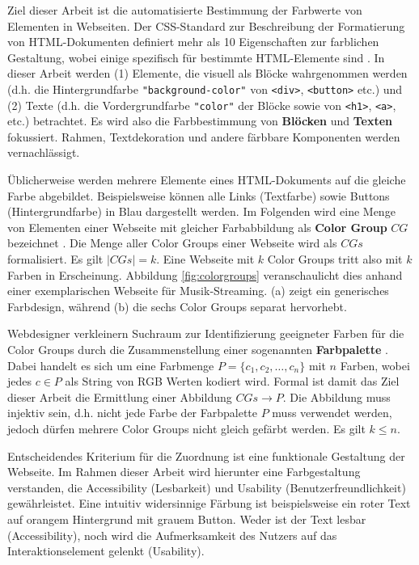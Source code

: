 \documentclass[11pt,a4paper,bibliography=totoc,twocolumn]{scrartcl}
\begin{document}
Ziel dieser Arbeit ist die automatisierte Bestimmung der Farbwerte von Elementen in Webseiten. Der CSS-Standard zur Beschreibung der Formatierung von HTML-Dokumenten definiert mehr als 10 Eigenschaften zur farblichen Gestaltung, wobei einige spezifisch für bestimmte  HTML-Elemente sind  \citep{css3-color}. In dieser Arbeit werden (1) Elemente, die visuell als Blöcke wahrgenommen werden (d.h. die Hintergrundfarbe \texttt{"background-color"} von \texttt{<div>}, \texttt{<button>} etc.) und (2) Texte (d.h. die Vordergrundfarbe \texttt{"color"} der Blöcke sowie von \texttt{<h1>}, \texttt{<a>}, etc.) betrachtet. Es wird also die Farbbestimmung von \textbf{Blöcken} und \textbf{Texten} fokussiert. Rahmen, Textdekoration und andere färbbare Komponenten werden vernachlässigt.

Üblicherweise werden mehrere Elemente eines HTML-Dokuments auf die gleiche Farbe abgebildet. Beispielsweise können alle Links (Textfarbe) sowie Buttons (Hintergrundfarbe) in Blau dargestellt werden. Im Folgenden wird eine Menge von Elementen einer Webseite mit gleicher Farbabbildung als \textbf{Color Group} $CG$ bezeichnet \citep[siehe auch][]{webpage, patterns}. Die Menge aller Color Groups einer Webseite wird als $CGs$ formalisiert. Es gilt $|CGs| = k$. Eine Webseite mit $k$ Color Groups tritt also mit $k$ Farben in Erscheinung. Abbildung \ref{fig:colorgroups} veranschaulicht dies anhand einer exemplarischen Webseite für Musik-Streaming. (a) zeigt ein generisches Farbdesign, während (b) die sechs Color Groups separat hervorhebt.

Webdesigner verkleinern Suchraum zur Identifizierung geeigneter Farben für die Color Groups durch die Zusammenstellung einer sogenannten \textbf{Farbpalette} \citep{webpage, webdesign, webx0}. Dabei handelt es sich um eine Farbmenge $P = \{c_1, c_2, \ldots, c_n\}$ mit $n$ Farben, wobei jedes $c \in P$ als String von RGB Werten kodiert wird. Formal ist damit das Ziel dieser Arbeit die Ermittlung einer Abbildung $CGs \to P$. Die Abbildung muss injektiv sein, d.h. nicht jede Farbe der Farbpalette $P$ muss verwendet werden, jedoch dürfen mehrere Color Groups nicht gleich gefärbt werden. Es gilt $k \leq n$.

Entscheidendes Kriterium für die Zuordnung ist eine funktionale Gestaltung der Webseite. Im Rahmen dieser Arbeit wird hierunter eine Farbgestaltung verstanden, die Accessibility (Lesbarkeit) und Usability (Benutzerfreundlichkeit) gewährleistet. Eine intuitiv widersinnige Färbung ist beispielsweise ein roter Text auf orangem Hintergrund mit grauem Button. Weder ist der Text lesbar (Accessibility), noch wird die Aufmerksamkeit des Nutzers auf das Interaktionselement gelenkt (Usability). 
\end{document}
